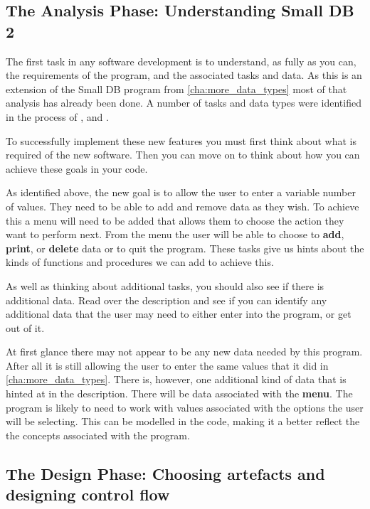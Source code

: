 
\subsection{The Analysis Phase: Understanding Small DB 2} %
\label{sub:understanding_small_db_2}

The first task in any software development is to understand, as fully as you can, the requirements of the program, and the associated tasks and data. As this is an extension of the Small DB program from \cref{cha:more_data_types} most of that analysis has already been done. A number of tasks and data types were identified in the process of , and . 

To successfully implement these new features you must first think about what is required of the new software. Then you can move on to think about how you can achieve these goals in your code.

As identified above, the new goal is to allow the user to enter a variable number of values. They need to be able to add and remove data as they wish. To achieve this a menu will need to be added that allows them to choose the action they want to perform next. From the menu the user will be able to choose to \textbf{add}, \textbf{print}, or \textbf{delete} data or to quit the program. These tasks give us hints about the kinds of functions and procedures we can add to achieve this.

As well as thinking about additional tasks, you should also see if there is additional data. Read over the description and see if you can identify any additional data that the user may need to either enter into the program, or get out of it.

At first glance there may not appear to be any new data needed by this program. After all it is still allowing the user to enter the same values that it did in \cref{cha:more_data_types}. There is, however, one additional kind of data that is hinted at in the description. There will be data associated with the \textbf{menu}. The program is likely to need to work with values associated with the options the user will be selecting. This can be modelled in the code, making it a better reflect the the concepts associated with the program.


\subsection{The Design Phase: Choosing artefacts and designing control flow} %
\label{sub:the_design_process_choosing_artefacts_for_small_db_2_and_designing_control_flow}

